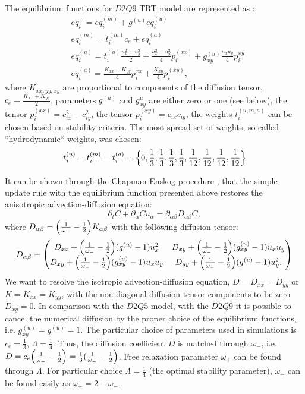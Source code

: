 \documentclass{article}
\newcommand{\beq}{\begin{equation}}
\newcommand{\feq}{\end{equation}}
\newcommand{\omegaplus}{\omega_{+}}
\newcommand{\omegaminus}{\omega_{-}}
\begin{document}
The equilibrium functions for $D2Q9$ TRT model are represented as \cite{kuzmin-stability-optimal}:
\begin{equation}
\begin{aligned}
&eq_i^{+}=eq_i^{(m)}+g^{(u)} eq_i^{(u)}\\
&eq_i^{(m)}=t_i^{(m)} c_e+ eq_i^{(a)}\\
&eq_i^{(u)}=t_i^{(u)} \frac{u_x^2+u_y^2}{2}+\frac{u_x^2-u_y^2}{4} p_i^{(xx)}+g_{xy}^{(u)}\frac{u_x
u_y}{4} p_i^{xy}\\
&eq_i^{(a)}=\frac{K_{xx}-K_{yy}}{4} p_i^{xx}+\frac{K_{xy}}{4} p_i^{(xy)},
\end{aligned}
\end{equation}
where $K_{xx,yy,xy}$ are proportional to components of the diffusion tensor,
$c_e=\frac{K_{xx}+K_{yy}}{2}$, parameters $g^{(u)}$ and $g^{u}_{xy}$ are either zero or one (see
below), the tensor $p_i^{(xx)}=c_{ix}^2-c_{iy}^2$, the tensor $p_i^{(xy)}=c_{ix} c_{iy}$, the
weights
$t_i^{(u,m,a)}$ can be chosen based on stability criteria. The most spread set of weights, so called
``hydrodynamic`` weights, was chosen:
\begin{equation}
t_i^{(u)}=t_i^{(m)}=t_i^{(a)}=\Bigl\{0,\frac{1}{3},\frac{1}{3},\frac{1}{3},\frac{1}{3},\frac{1}{12},
\frac {1}{12},\frac{1}{12},\frac{1}{12}\Bigr\}
\end{equation}
 
It can be shown through the Chapman-Enskog procedure \cite{chapman}, that the simple update rule
with the equilibrium function presented above restores the anisotropic
advection-diffusion equation:
\beq
\partial_t C+ \partial_{\alpha} C u_{\alpha}=\partial_{\alpha\beta} D_{\alpha\beta} C,
\feq
where $D_{\alpha\beta}=\Bigl(\frac{1}{\omegaminus}-\frac{1}{2}\Bigr)K_{\alpha\beta}$
with the
following diffusion tensor:
\begin{equation}
D_{\alpha\beta}=
\begin{pmatrix}
D_{xx} + \Bigl(\frac{1}{\omegaminus}-\frac{1}{2}\Bigr)(g^{(u)}-1) u_x^2 &
D_{xy}+\Bigl(\frac{1}{\omegaminus}-\frac{1}{2}\Bigr)(g_{xy}^{(u)}-1)u_x u_y\\
D_{xy} + \Bigl(\frac{1}{\omegaminus}-\frac{1}{2}\Bigr)(g_{xy}^{(u)}-1) u_x u_y&
D_{yy}+\Bigl(\frac{1}{\omegaminus}-\frac{1}{2}\Bigr)(g^{(u)}-1) u_y^2. 
\end{pmatrix}
\end{equation}
We want to resolve the isotropic advection-diffusion equation, $D=D_{xx}=D_{yy}$ or
$K=K_{xx}=K_{yy}$, with the non-diagonal diffusion tensor components to be zero $D_{xy}=0$. In
comparison with the $D2Q5$ model, with the $D2Q9$ it is
possible to cancel the numerical diffusion by the proper choice
of the equilibrium functions, i.e. $g_{xy}^{(u)}=g^{(u)}=1$.  The particular choice of parameters
used in simulations is $c_e=\frac{1}{3}$, $\Lambda=\frac{1}{4}$. Thus, the diffusion coefficient $D$
is matched through $\omegaminus$, i.e. $D=c_e
\Bigl(\frac{1}{\omegaminus}-\frac{1}{2}\Bigr)=\frac{1}{3}(\frac{1}{\omegaminus}-\frac{1}{2}\Bigr)$.
 Free relaxation parameter $\omegaplus$ can be found through $\Lambda$. For particular
choice $\Lambda=\frac{1}{4}$ (the optimal stability parameter), $\omegaplus$ can be found easily as
 $\omegaplus=2-\omegaminus$.  
\end{document}
